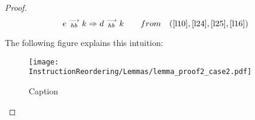 \begin{proof}
    \[
        e\stackrel{\longrightarrow}{_{hb}}k \Rightarrow d\stackrel{\longrightarrow}{_{hb}}k
        \qquad from \quad
        (\ref{l10}, \ref{l24},  \ref{l25}, \ref{l16})
    \]
    
    The following figure explains this intuition: 
    
    \begin{figure}[H]
        \centering
        \texttt{[image: InstructionReordering/Lemmas/lemma\_proof2\_case2.pdf]}
        \caption{Caption}
        \label{fig:my_label}
    \end{figure}

\end{proof}

